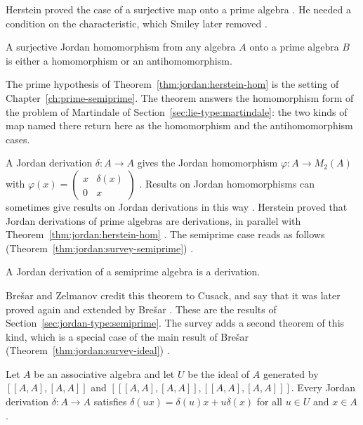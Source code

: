 Herstein proved the case of a surjective map onto a prime algebra \cite[p.~212]{BresarZelmanov2025}.
He needed a condition on the characteristic, which Smiley later removed
\cite[p.~212]{BresarZelmanov2025}.

\begin{theorem}\label{thm:jordan:herstein-hom}
A surjective Jordan homomorphism from any algebra $A$ onto a prime algebra $B$ is either a
homomorphism or an antihomomorphism.
\end{theorem}

The prime hypothesis of Theorem~\ref{thm:jordan:herstein-hom} is the setting of
Chapter~\ref{ch:prime-semiprime}. The theorem answers the homomorphism form of
the problem of Martindale of Section~\ref{sec:lie-type:martindale}: the two kinds of
map named there return here as the homomorphism and the antihomomorphism cases. %

A Jordan derivation $\delta\colon A\to A$ gives the
Jordan homomorphism $\varphi\colon A\to M_{2}(A)$ with $\varphi(x)=\begin{pmatrix}x&\delta(x)\\0&x\end{pmatrix}$
\cite[Section~11, p.~224]{BresarZelmanov2025}. Results on Jordan homomorphisms can sometimes give
results on Jordan derivations in this way \cite[p.~224]{BresarZelmanov2025}. Herstein proved that Jordan
derivations of prime algebras are derivations, in parallel with Theorem~\ref{thm:jordan:herstein-hom}
\cite[p.~224]{BresarZelmanov2025}. The semiprime case reads as follows (Theorem~\ref{thm:jordan:survey-semiprime}) \cite[p.~225]{BresarZelmanov2025}.

\begin{theorem}\label{thm:jordan:survey-semiprime}
A Jordan derivation of a semiprime algebra is a derivation.
\end{theorem}

Brešar and Zelmanov credit this theorem to Cusack, and say that it was later proved again
and extended by Brešar \cite[p.~225]{BresarZelmanov2025}. These are the results of
Section~\ref{sec:jordan-type:semiprime}. The survey adds a second theorem of this kind, which
is a special case of the main result of Brešar (Theorem~\ref{thm:jordan:survey-ideal}) \cite[p.~225]{BresarZelmanov2025}.

\begin{theorem}\label{thm:jordan:survey-ideal}
Let $A$ be an associative algebra and let $U$ be the ideal of $A$ generated by
$[[A,A],[A,A]]$ and $[[[A,A],[A,A]],[[A,A],[A,A]]]$. Every Jordan derivation $\delta\colon A\to A$
satisfies $\delta(ux)=\delta(u)x+u\delta(x)$ for all $u\in U$ and $x\in A$.
\end{theorem}
